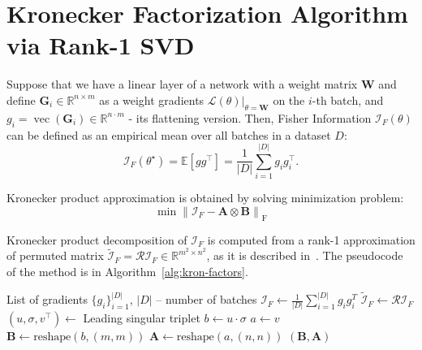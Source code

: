 \documentclass{article}
\DeclareMathOperator{\vect}{vec}
\begin{document}
\section{Kronecker Factorization Algorithm via Rank-1 SVD}
\label{sec:kron_algo}


Suppose that we have a linear layer of a network with a weight matrix $\mathbf{W}$ and define $\mathbf{G}_i\in \mathbb{R}^{n \times m}$ as a weight gradients $\mathcal{L}(\theta)|_{\theta= \mathbf{W}}$  on the $i$-th batch, and $g_i = \vect({\mathbf{G}_i}) \in \mathbb{R}^{n \cdot m}$ - its flattening version.
Then, Fisher Information $\mathcal{I}_F(\theta)$ can be defined as an empirical mean over all batches in a dataset $D$:
\begin{equation}
 \mathcal{I}_F(\theta^{\star}) = \mathbb{E}\left[g g^\top\right] = \frac{1}{|D|}\sum_{i=1}^{|D|}{g}_{i}^{}{g}_{i}^\top.
 \label{eq:J}
\end{equation}

Kronecker product approximation is obtained by solving minimization problem:
\begin{equation}
\min \left\| \mathcal{I}_F - \mathbf{A} \otimes \mathbf{B} \right\|_{\operatorname{F}}
\label{eq:min_probles}
\end{equation}

Kronecker product decomposition of $\mathcal{I}_F$ is computed from a rank-1 approximation of permuted matrix $\tilde{\mathcal{I}}_F = \mathcal{R} \mathcal{I}_F \in \mathbb{R}^{m^2\times n^2}$, as it is described in~\cite{Loan1992}. The pseudocode of the method is in Algorithm~\ref{alg:kron-factors}. 

\begin{algorithm}[h]
\caption{Compute Kronecker Factors via Rank-1 SVD}
\label{alg:kron-factors}
\begin{algorithmic}[1]
\Require List of gradients $\{g_i\}_{i=1}^{|D|}$, $|D|$ -- number of batches
\State $\mathcal{I}_F \gets \frac{1}{|D|}\sum_{i=1}^{|D|}g_{i}g_{i}^T$
\State $\tilde{\mathcal{I}}_F \gets \mathcal{R} \mathcal{I}_F$ 
\State $(u, \sigma, v^\top) \gets$ Leading singular triplet 
\State $b \gets u \cdot \sigma$ \Comment{$b = \vect(\mathbf{B})$}
\State $a \gets v$ \Comment{$a = \vect(\mathbf{A})$}
\State $\mathbf{B} \gets \text{reshape}(b, (m, m))$
\State $\mathbf{A} \gets \text{reshape}(a, (n, n))$
\State \Return $(\mathbf{B}, \mathbf{A})$
\end{algorithmic}
\end{algorithm}
\end{document}
